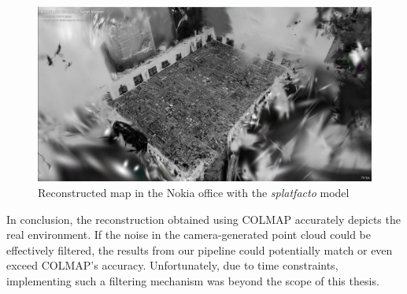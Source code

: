 \begin{figure}[htbp]
	\centering
	\includegraphics[width=150mm, keepaspectratio]{figures_jpg/nokia_splatfacto_2.jpg}
	\caption{Reconstructed map in the Nokia office with the \textit{splatfacto} model}
	\label{fig:nokia_splatfacto_colmap_2}
\end{figure}

In conclusion, the reconstruction obtained using COLMAP accurately depicts the real environment. If the noise in the camera-generated point cloud could be effectively filtered, the results from our pipeline could potentially match or even exceed COLMAP's accuracy. Unfortunately, due to time constraints, implementing such a filtering mechanism was beyond the scope of this thesis.
